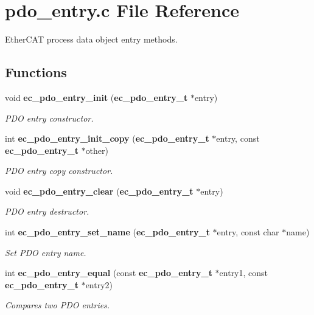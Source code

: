 \section{pdo\-\_\-entry.\-c File Reference}
\label{pdo__entry_8c}


Ether\-C\-A\-T process data object entry methods.  


\subsection*{Functions}
\begin{DoxyCompactItemize}
\item 
void {\bf ec\-\_\-pdo\-\_\-entry\-\_\-init} ({\bf ec\-\_\-pdo\-\_\-entry\-\_\-t} $\ast$entry)
\begin{DoxyCompactList}\small\item\em P\-D\-O entry constructor. \end{DoxyCompactList}\item 
int {\bf ec\-\_\-pdo\-\_\-entry\-\_\-init\-\_\-copy} ({\bf ec\-\_\-pdo\-\_\-entry\-\_\-t} $\ast$entry, const {\bf ec\-\_\-pdo\-\_\-entry\-\_\-t} $\ast$other)
\begin{DoxyCompactList}\small\item\em P\-D\-O entry copy constructor. \end{DoxyCompactList}\item 
void {\bf ec\-\_\-pdo\-\_\-entry\-\_\-clear} ({\bf ec\-\_\-pdo\-\_\-entry\-\_\-t} $\ast$entry)
\begin{DoxyCompactList}\small\item\em P\-D\-O entry destructor. \end{DoxyCompactList}\item 
int {\bf ec\-\_\-pdo\-\_\-entry\-\_\-set\-\_\-name} ({\bf ec\-\_\-pdo\-\_\-entry\-\_\-t} $\ast$entry, const char $\ast$name)
\begin{DoxyCompactList}\small\item\em Set P\-D\-O entry name. \end{DoxyCompactList}\item 
int {\bf ec\-\_\-pdo\-\_\-entry\-\_\-equal} (const {\bf ec\-\_\-pdo\-\_\-entry\-\_\-t} $\ast$entry1, const {\bf ec\-\_\-pdo\-\_\-entry\-\_\-t} $\ast$entry2)
\begin{DoxyCompactList}\small\item\em Compares two P\-D\-O entries. \end{DoxyCompactList}\end{DoxyCompactItemize}



